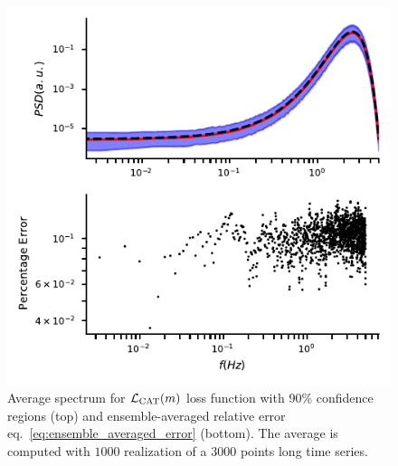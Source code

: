 \documentclass[twocolumn,showpacs,preprintnumbers,nofootinbib,prd,
superscriptaddress,10pt]{revtex4-1}
\begin{document}
\begin{figure}[t]
	\centering
	\includegraphics[width = \linewidth]{Images/optimisers_comparison/normal/CAT_spectrum_estim.pdf}
	\caption{Average spectrum for $\mathcal{L}_{\rm CAT}(m)$ loss function with 90\% confidence regions (top) and ensemble-averaged relative error eq.~\eqref{eq:ensemble_averaged_error} (bottom). The average is computed with $1000$ realization of a $3000$ points long time series.}
	\label{fig:CATmean}
\end{figure} 
\end{document}
